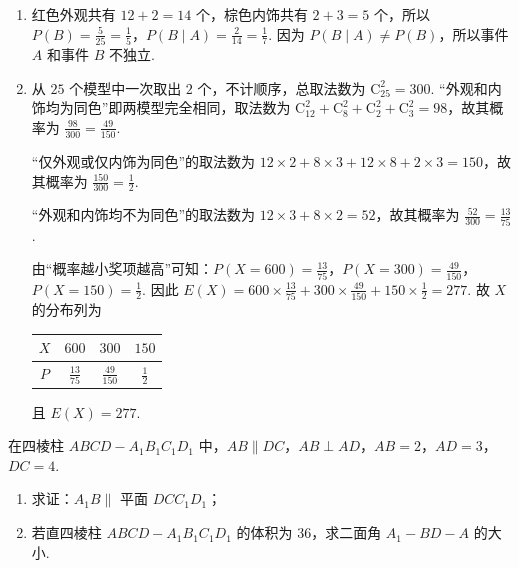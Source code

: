 \begin{solution}
\begin{enumerate}
\item 红色外观共有 \(12+2=14\) 个，棕色内饰共有 \(2+3=5\) 个，所以 \(P(B)=\frac{5}{25}=\frac15\)，\(P(B\mid A)=\frac{2}{14}=\frac17\).
因为 \(P(B\mid A)\ne P(B)\)，所以事件 \(A\) 和事件 \(B\) 不独立.

\item 从 \(25\) 个模型中一次取出 \(2\) 个，不计顺序，总取法数为 \(\mathrm C_{25}^{2}=300\).
“外观和内饰均为同色”即两模型完全相同，取法数为 \(\mathrm C_{12}^{2}+\mathrm C_{8}^{2}+\mathrm C_{2}^{2}+\mathrm C_{3}^{2}=98\)，故其概率为 \(\frac{98}{300}=\frac{49}{150}\).

“仅外观或仅内饰为同色”的取法数为 \(12\times 2+8\times 3+12\times 8+2\times 3=150\)，故其概率为 \(\frac{150}{300}=\frac12\).

“外观和内饰均不为同色”的取法数为 \(12\times 3+8\times 2=52\)，故其概率为 \(\frac{52}{300}=\frac{13}{75}\).

由“概率越小奖项越高”可知：\(P(X=600)=\frac{13}{75}\)，\(P(X=300)=\frac{49}{150}\)，\(P(X=150)=\frac12\).
因此 \(E(X)=600\times \frac{13}{75}+300\times \frac{49}{150}+150\times \frac12=277\).
故 \(X\) 的分布列为
{\centering
\begin{tabular}{c|ccc}
\(X\) & \(600\) & \(300\) & \(150\) \\
\hline
\(P\) & \(\frac{13}{75}\) & \(\frac{49}{150}\) & \(\frac12\)
\end{tabular}
\par}
且 \(E(X)=277\).
\end{enumerate}
\end{solution}

\begin{problem}
在四棱柱 \(ABCD-A_1B_1C_1D_1\) 中，\(AB\parallel DC\)，\(AB\perp AD\)，\(AB=2\)，\(AD=3\)，\(DC=4\).

\begin{enumerate}
\item 求证：\(A_1B\parallel\) 平面 \(DCC_1D_1\)；
\item 若直四棱柱 \(ABCD-A_1B_1C_1D_1\) 的体积为 \(36\)，求二面角 \(A_1-BD-A\) 的大小.
\end{enumerate}

\end{problem}

